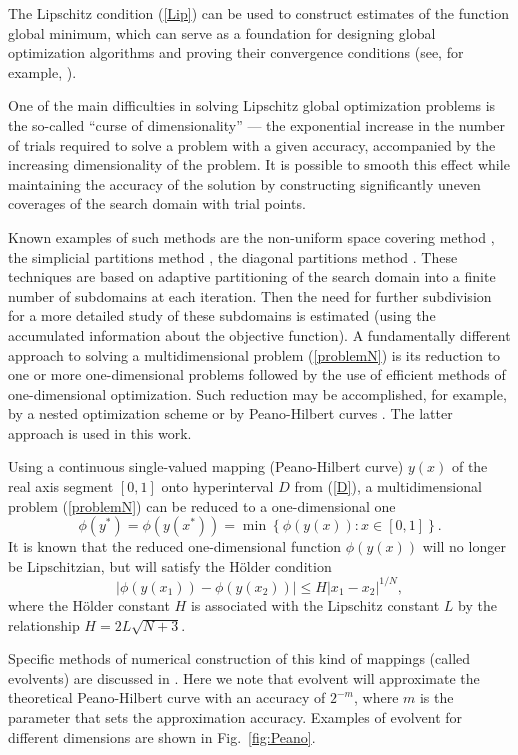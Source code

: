 \documentclass[mathematics,article,submit,pdftex,moreauthors]{Definitions/mdpi}
\begin{document}
The Lipschitz condition (\ref{Lip}) can be used to construct estimates of the function global minimum, which can serve as a foundation for designing global optimization algorithms and proving their convergence conditions (see, for example, \cite{Strongin2000}).

One of the main difficulties in solving Lipschitz global optimization problems is the so-called ``curse of dimensionality'' --- the exponential increase in the number of trials required to solve a problem with a given accuracy, accompanied by the increasing dimensionality of the problem. It is possible to smooth this effect while maintaining the accuracy of the solution by constructing significantly uneven coverages of the search domain with trial points.

Known examples of such methods are the non-uniform space covering method \cite{Evtushenko2013}, the simplicial partitions method \cite{PaulaviciusZilinskas2014}, the diagonal partitions method \cite{Sergeyev2017}. These techniques are based on adaptive partitioning of the search domain into a finite number of subdomains at each iteration.
Then the need for further subdivision for a more detailed study of these subdomains is estimated (using the accumulated information about the objective function). 
A fundamentally different approach to solving a multidimensional problem (\ref{problemN}) is its reduction to one or more one-dimensional problems followed by the use of efficient methods of one-dimensional optimization. Such reduction may be accomplished, for example, by a nested optimization scheme \cite{Grishagin2018} or by Peano-Hilbert curves \cite{Barkalov2018}. The latter approach is used in this work.

Using a continuous single-valued mapping (Peano-Hilbert curve) $y(x)$ of the real axis segment $[0,1]$ onto hyperinterval $D$ from (\ref{D}), a multidimensional problem (\ref{problemN}) can be reduced to a one-dimensional one
\[
\phi(y^\ast)=\phi(y(x^\ast))=\min{\left\{\phi(y(x)): x\in[0,1]\right\}}.
\]
It is known \cite{Strongin2000, Sergeyev2013} that the reduced one-dimensional function $\phi(y(x))$ will no longer be Lipschitzian, but will satisfy the H{\"o}lder condition
\[
\left|\phi(y(x_1))-\phi(y(x_2))\right|\leq H\left|x_1-x_2\right|^{1/N},
\]
where the H{\"o}lder constant $H$ is associated with the Lipschitz constant $L$ by the relationship $ H=2 L \sqrt{N+3}$.

Specific methods of numerical construction of this kind of mappings (called evolvents) are discussed in \cite{Strongin2000,Sergeyev2013}.
Here we note that evolvent will approximate the theoretical Peano-Hilbert curve with an accuracy of $2^{-m}$, where $m$ is the parameter that sets the approximation accuracy. Examples of evolvent for different dimensions are shown in Fig.~\ref{fig:Peano}.
\end{document}
